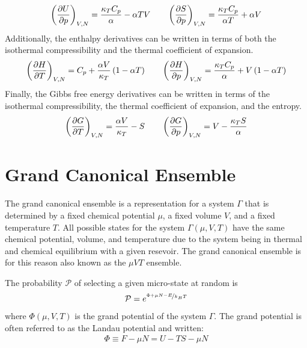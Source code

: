 \begin{align}
    \left( \pdv{U}{p} \right )_{V,N} = \frac{\kappa_T C_p}{\alpha} - \alpha TV \quad\quad
    \left( \pdv{S}{p} \right )_{V,N} = \frac{\kappa_T C_p}{\alpha T} + \alpha V
\end{align}
Additionally, the enthalpy derivatives can be written in terms of both the isothermal compressibility and the thermal coefficient of expansion.
\begin{align}
    \left( \pdv{H}{T} \right )_{V,N} = C_p + \frac{\alpha V}{\kappa_T}\left(1-\alpha T\right) \quad\quad
    \left( \pdv{H}{p} \right )_{V,N} = \frac{\kappa_T C_p}{\alpha} + V\left(1-\alpha T\right)
\end{align}
Finally, the Gibbs free energy derivatives can be written in terms of the isothermal compressibility, the thermal coefficient of expansion, and the entropy.
\begin{align}
    \left( \pdv{G}{T} \right )_{V,N} = \frac{\alpha V}{\kappa_T}-S \quad\quad
    \left( \pdv{G}{p} \right )_{V,N} = V-\frac{\kappa_T S}{\alpha}
\end{align}

\section{Grand Canonical Ensemble}
The grand canonical ensemble is a representation for a system $\Gamma$ that is determined by a fixed chemical potential $\mu$, a fixed volume $V$, and a fixed temperature $T$. All possible states for the system $\Gamma\left(\mu,V,T\right)$ have the same chemical potential, volume, and temperature due to the system being in thermal and chemical equilibrium with a given resevoir.
The grand canonical ensemble is for this reason also known as the $\mu VT$ ensemble.

The probability $\mathcal{P}$ of selecting a given micro-state at random is
\begin{align}
    \mathcal{P} = e^{\nicefrac{\Phi + \mu N-E}{k_BT}}
\end{align}
where $\Phi\left(\mu,V,T\right)$ is the grand potential of the system $\Gamma$. The grand potential is often referred to as the Landau potential and written:
\begin{align}
    \Phi \equiv F -\mu N = U - TS -\mu N
\end{align}

